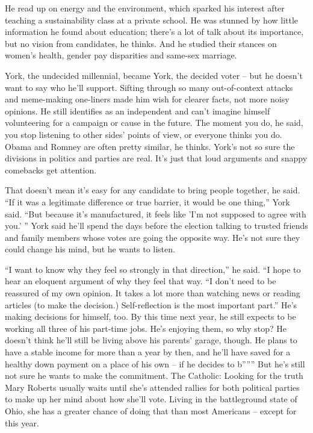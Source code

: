 \documentclass[%
        TwoSidePages,%
        Portuguese,%
        FinalVersion,%
        TablesPage,%
        FiguresPage,%
        ]%
{ic-tese-v2}
\begin{document}
He read up on energy and the environment, which sparked his interest after teaching a sustainability class at a private school. He was stunned by how little information he found about education; there's a lot of talk about its importance, but no vision from candidates, he thinks. And he studied their stances on women's health, gender pay disparities and same-sex marriage.

York, the undecided millennial, became York, the decided voter -- but he doesn't want to say who he'll support. Sifting through so many out-of-context attacks and meme-making one-liners made him wish for clearer facts, not more noisy opinions.
He still identifies as an independent and can't imagine himself volunteering for a campaign or cause in the future. The moment you do, he said, you stop listening to other sides' points of view, or everyone thinks you do. Obama and Romney are often pretty similar, he thinks. York's not so sure the divisions in politics and parties are real. It's just that loud arguments and snappy comebacks get attention.

That doesn't mean it's easy for any candidate to bring people together, he said.
``If it was a legitimate difference or true barrier, it would be one thing,'' York said. ``But because it's manufactured, it feels like 'I'm not supposed to agree with you.' ''
York said he'll spend the days before the election talking to trusted friends and family members whose votes are going the opposite way. He's not sure they could change his mind, but he wants to listen.

``I want to know why they feel so strongly in that direction,'' he said. ``I hope to hear an eloquent argument of why they feel that way.
``I don't need to be reassured of my own opinion. It takes a lot more than watching news or reading articles (to make the decision.) Self-reflection is the most important part.''
He's making decisions for himself, too. By this time next year, he still expects to be working all three of his part-time jobs. He's enjoying them, so why stop? He doesn't think he'll still be living above his parents' garage, though. He plans to have a stable income for more than a year by then, and he'll have saved for a healthy down payment on a place of his own -- if he decides to b”””
But he's still not sure he wants to make the commitment.
The Catholic: Looking for the truth
Mary Roberts usually waits until she's attended rallies for both political parties to make up her mind about how she'll vote. Living in the battleground state of Ohio, she has a greater chance of doing that than most Americans -- except for this year.
\end{document}
